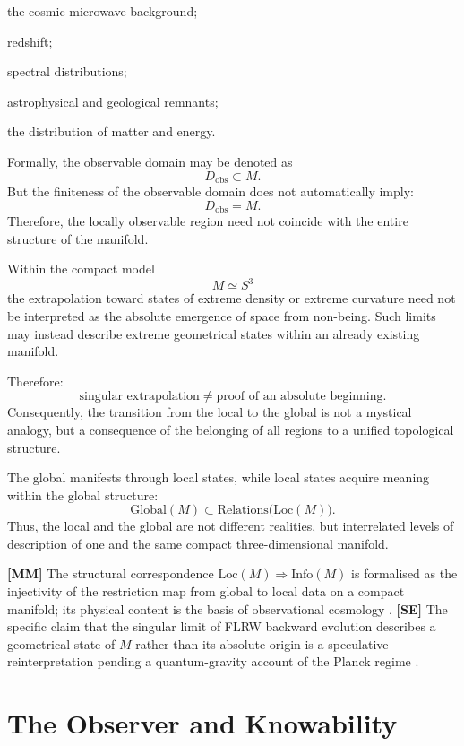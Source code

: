\documentclass[12pt,a4paper]{article}
\theoremstyle{definition}
\begin{document}
the cosmic microwave background;

redshift;

spectral distributions;

astrophysical and geological remnants;

the distribution of matter and energy.

Formally, the observable domain may be denoted as
\[
D_{\mathrm{obs}}\subset M.
\]
But the finiteness of the observable domain does not automatically imply:
\[
D_{\mathrm{obs}}=M.
\]
Therefore, the locally observable region need not coincide with the entire structure of the manifold.

Within the compact model
\[
M\simeq S^3
\]
the extrapolation toward states of extreme density or extreme curvature need not be interpreted as the absolute emergence of space from non-being. Such limits may instead describe extreme geometrical states within an already existing manifold.

Therefore:
\[
\text{singular extrapolation}
\neq
\text{proof of an absolute beginning}.
\]
Consequently, the transition from the local to the global is not a mystical analogy, but a consequence of the belonging of all regions to a unified topological structure.

The global manifests through local states, while local states acquire meaning within the global structure:
\[
\mathrm{Global}(M)
\subset
\mathrm{Relations}\bigl(\mathrm{Loc}(M)\bigr).
\]
Thus, the local and the global are not different realities, but interrelated levels of description of one and the same compact three-dimensional manifold.

\medskip
\noindent\colorbox{clModel}{\small\textbf{[MM]}} The structural correspondence $\mathrm{Loc}(M)\Rightarrow\mathrm{Info}(M)$ is formalised as the injectivity of the restriction map from global to local data on a compact manifold; its physical content is the basis of observational cosmology \cite{Peebles1993,Ryden2003}.
\noindent\colorbox{clSpec}{\small\textbf{[SE]}} The specific claim that the singular limit of FLRW backward evolution describes a geometrical state of $M$ rather than its absolute origin is a speculative reinterpretation pending a quantum-gravity account of the Planck regime \cite{Isham1993,Penrose2004}.



\section{The Observer and Knowability}
\end{document}

